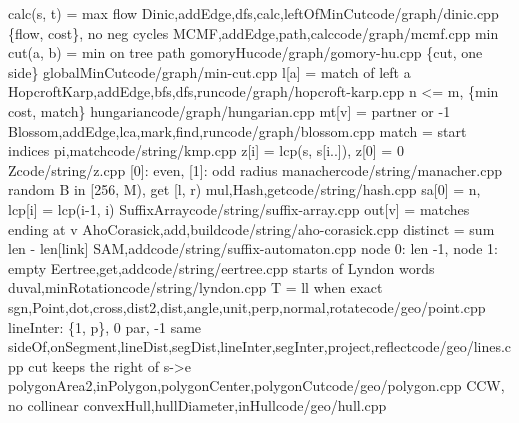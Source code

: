   {calc(s, t) = max flow}
  {Dinic,addEdge,dfs,calc,leftOfMinCut}{code/graph/dinic.cpp}
  {\{flow, cost\}, no neg cycles}
  {MCMF,addEdge,path,calc}{code/graph/mcmf.cpp}
  {min cut(a, b) = min on tree path}
  {gomoryHu}{code/graph/gomory-hu.cpp}
  {\{cut, one side\}}
  {globalMinCut}{code/graph/min-cut.cpp}
  {l[a] = match of left a}
  {HopcroftKarp,addEdge,bfs,dfs,run}{code/graph/hopcroft-karp.cpp}
  {n <= m, \{min cost, match\}}
  {hungarian}{code/graph/hungarian.cpp}
  {mt[v] = partner or -1}
  {Blossom,addEdge,lca,mark,find,run}{code/graph/blossom.cpp}
  {match = start indices}
  {pi,match}{code/string/kmp.cpp}
  {z[i] = lcp(s, s[i..]), z[0] = 0}
  {Z}{code/string/z.cpp}
  {[0]: even, [1]: odd radius}
  {manacher}{code/string/manacher.cpp}
  {random B in [256, M), get [l, r)}
  {mul,Hash,get}{code/string/hash.cpp}
  {sa[0] = n, lcp[i] = lcp(i-1, i)}
  {SuffixArray}{code/string/suffix-array.cpp}
  {out[v] = matches ending at v}
  {AhoCorasick,add,build}{code/string/aho-corasick.cpp}
  {distinct = sum len - len[link]}
  {SAM,add}{code/string/suffix-automaton.cpp}
  {node 0: len -1, node 1: empty}
  {Eertree,get,add}{code/string/eertree.cpp}
  {starts of Lyndon words}
  {duval,minRotation}{code/string/lyndon.cpp}
  {T = ll when exact}
  {sgn,Point,dot,cross,dist2,dist,angle,unit,perp,normal,rotate}{code/geo/point.cpp}
  {lineInter: \{1, p\}, 0 par, -1 same}
  {sideOf,onSegment,lineDist,segDist,lineInter,segInter,project,reflect}{code/geo/lines.cpp}
  {cut keeps the right of s->e}
  {polygonArea2,inPolygon,polygonCenter,polygonCut}{code/geo/polygon.cpp}
  {CCW, no collinear}
  {convexHull,hullDiameter,inHull}{code/geo/hull.cpp}
